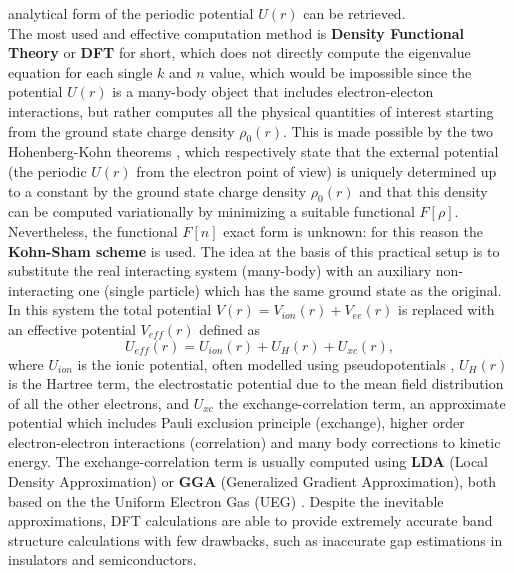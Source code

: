 \documentclass[12pt, a4paper]{report}
\numberwithin{equation}{section}
\begin{document}
analytical form of the periodic potential $U(r)$ can be retrieved.\\
The most used and effective computation method is \textbf{Density Functional Theory} \cite{thijssen2007computational} or \textbf{DFT} 
for short, which does not directly compute the eigenvalue equation for each single $k$ and $n$ value, which would be impossible since 
the potential $U(r)$ is a many-body object that includes electron-electon interactions, but rather computes all the physical quantities of 
interest starting from the ground state charge density $\rho_0(r)$. This is made possible by the two Hohenberg-Kohn theorems \cite{hohenberg1964inhomogeneous}, 
which respectively state that the external potential (the periodic $U(r)$ from the electron point of view) is uniquely determined 
up to a constant by the ground state charge density $\rho_0(r)$ and that this density can be computed variationally by minimizing a suitable 
functional $F[\rho]$.\\
Nevertheless, the functional $F[n]$ exact form is unknown: for this reason the \textbf{Kohn-Sham scheme} \cite{PhysRev.140.A1133} 
is used. The idea at the basis of this practical setup is to substitute the real interacting system (many-body) with an auxiliary non-interacting
one (single particle) which has the same ground state as the original. In this system the total potential $V(r)=V_{ion}(r)+V_{ee}(r)$ is 
replaced with an effective potential $V_{eff}(r)$ defined as
\begin{equation}
    U_{eff}(r)=U_{ion}(r)+U_H(r)+U_{xc}(r),
\end{equation}
where $U_{ion}$ is the ionic potential, often modelled using pseudopotentials \cite{kerker1980non}, $U_H(r)$ is the Hartree term, the electrostatic 
potential due to the mean field distribution of all the other electrons, and $U_{xc}$ the exchange-correlation term, an approximate potential 
which includes Pauli exclusion principle (exchange), higher order electron-electron interactions (correlation) and many body corrections to kinetic energy. The exchange-correlation 
term is usually computed using \textbf{LDA} (Local Density Approximation) or \textbf{GGA} (Generalized Gradient Approximation), both based on the the Uniform Electron 
Gas (UEG) \cite{ziesche1998density}.
Despite the inevitable approximations, DFT calculations are able to provide extremely accurate band structure calculations 
with few drawbacks, such as inaccurate gap estimations in insulators and semiconductors.
\end{document}
